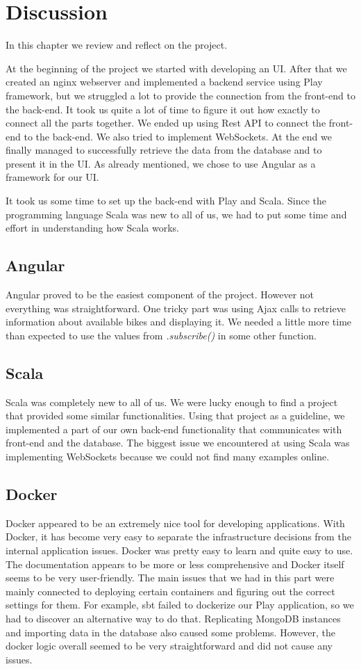 \section{Discussion}

In this chapter we review and reflect on the project.

At the beginning of the project we started with developing an UI. After that we created an nginx webserver and implemented a backend service using Play framework, but we struggled a lot to provide the connection from the front-end to the back-end. It took us quite a lot of time to figure it out how exactly to connect all the parts together. We ended up using Rest API  to connect the front-end to the back-end. We also tried to implement WebSockets. At the end we finally managed to successfully retrieve the data from the database and to present it in the UI. As already mentioned, we chose to use Angular as a framework for our UI.

It took us some time to set up the back-end with Play and Scala. Since the programming language Scala was new to all of us, we had to put some time and effort in understanding how Scala works.

\subsection{Angular}
Angular proved to be the easiest component of the project.  However not everything was straightforward. One tricky part was using Ajax calls to retrieve information about available bikes and displaying it. We needed a little more time than expected to use the values from \textit{.subscribe()} in some other function.
\subsection{Scala}
Scala was completely new to all of us. We were lucky enough to find a project that provided some similar functionalities. Using that project as a guideline, we implemented a part of our own back-end functionality that communicates with front-end and the database. The biggest issue we encountered at using Scala was implementing WebSockets because we could not find many examples online.
\subsection{Docker}
Docker appeared to be an extremely nice tool for developing applications. With Docker, it has become very easy to separate the infrastructure decisions from the internal application issues. Docker was pretty easy to learn and quite easy to use. The documentation appears to be more or less comprehensive and Docker itself seems to be very user-friendly. The main issues that we had in this part were mainly connected to deploying certain containers and figuring out the correct settings for them. For example, sbt failed to dockerize our Play application, so we had to discover an alternative way to do that. Replicating MongoDB instances and importing data in the database also caused some problems. However, the docker logic overall seemed to be very straightforward and did not cause any issues.

